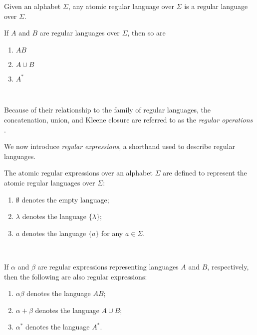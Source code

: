 \documentclass{bcthesis}
\renewcommand{\meo}[1]{}
\newcommand{\footcite}[2]{\xspace\cite[pg.~{#2}]{#1}\xspace}
\begin{document}
	\begin{definition}
		Given an alphabet $\Sigma$, any atomic regular language over $\Sigma$ is a regular language over $\Sigma$.
		
		If $A$ and $B$ are regular languages over $\Sigma$, then so are 
		\begin{enumerate}[label=(\roman*), itemsep = -0.3 ex, nolistsep]
			\item $AB$
			\item $A \cup B$
			\item $A^*$
		\end{enumerate}
		\footcite{rosen}{879}~\meo{todo: something about this citation}
	\end{definition}

	\begin{remark}
		Because of their relationship to the family of regular languages, the concatenation, union, and Kleene closure are referred to as the \textit{regular operations} \footcite{salomaa}{26}.
	\end{remark}

	We now introduce \textit{regular expressions}, a shorthand used to describe regular languages.

	\begin{definition}
		The atomic regular expressions over an alphabet $\Sigma$ are defined to represent the atomic regular languages over $\Sigma$:
		\begin{enumerate}[label=(\roman*), itemsep = -0.3 ex, nolistsep]
			\item $\emptyset$ denotes the empty language;
			\item $\lambda$ denotes the language $\{ \lambda \}$;
			\item $a$ denotes the language $\{ a \}$ for any $a \in \Sigma$.
		\end{enumerate}
		\footcite{hopcroft}{28--29}~\meo{todo: something about this citation}

		If $\alpha$ and $\beta$ are regular expressions representing languages $A$ and $B$, respectively, then the following are also regular expressions:
		\begin{enumerate}[label=(\roman*), itemsep = -0.3 ex, nolistsep]
			\item $\alpha \beta$ denotes the language $AB$;
			\item $\alpha + \beta$ denotes the language $A \cup B$;
			\item $\alpha^*$ denotes the language $A^*$.
		\end{enumerate}
		\footcite{hopcroft}{28--29}~\meo{todo: something about this citation}
	\end{definition}
\end{document}
